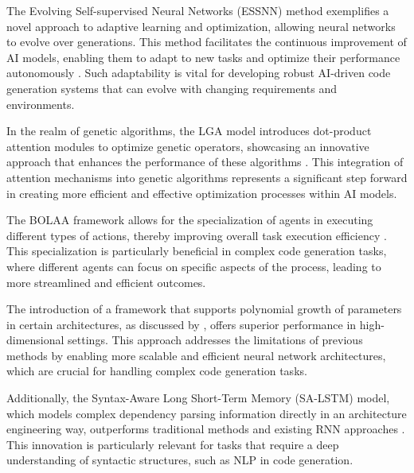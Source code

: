 The Evolving Self-supervised Neural Networks (ESSNN) method exemplifies a novel approach to adaptive learning and optimization, allowing neural networks to evolve over generations. This method facilitates the continuous improvement of AI models, enabling them to adapt to new tasks and optimize their performance autonomously \cite{le2019evolvingselfsupervisedneuralnetworks}. Such adaptability is vital for developing robust AI-driven code generation systems that can evolve with changing requirements and environments.



In the realm of genetic algorithms, the LGA model introduces dot-product attention modules to optimize genetic operators, showcasing an innovative approach that enhances the performance of these algorithms \cite{lange2023discoveringattentionbasedgeneticalgorithms}. This integration of attention mechanisms into genetic algorithms represents a significant step forward in creating more efficient and effective optimization processes within AI models.



The BOLAA framework allows for the specialization of agents in executing different types of actions, thereby improving overall task execution efficiency \cite{liu2023bolaabenchmarkingorchestratingllmaugmented}. This specialization is particularly beneficial in complex code generation tasks, where different agents can focus on specific aspects of the process, leading to more streamlined and efficient outcomes.



The introduction of a framework that supports polynomial growth of parameters in certain architectures, as discussed by \cite{morina2024growthparametersapproximatingrelu}, offers superior performance in high-dimensional settings. This approach addresses the limitations of previous methods by enabling more scalable and efficient neural network architectures, which are crucial for handling complex code generation tasks.



Additionally, the Syntax-Aware Long Short-Term Memory (SA-LSTM) model, which models complex dependency parsing information directly in an architecture engineering way, outperforms traditional methods and existing RNN approaches \cite{qian2017syntaxawarelstmmodel}. This innovation is particularly relevant for tasks that require a deep understanding of syntactic structures, such as NLP in code generation.




